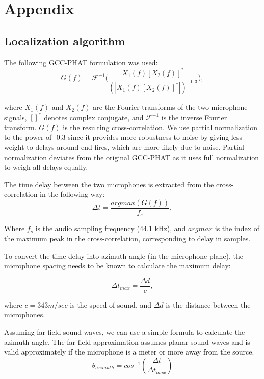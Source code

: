 \section{Appendix}

\subsection{Localization algorithm}  \label{label:gcc_phat}

The following GCC-PHAT formulation was used: 
\begin{equation}
G(f) = \mathcal{F}^{-1}\bigg(\frac{X_1(f)[X_2(f)]^*}{(|X_1(f)[X_2(f)]^*|)^{-0.3}}\bigg) ,
\end{equation}

where $X_1(f)$ and $X_2(f)$ are the Fourier transforms of the two microphone signals, $[]^*$ denotes complex conjugate, and $\mathcal{F}^{-1}$ is the inverse Fourier transform. $G(f)$ is the resulting cross-correlation. 
We use partial normalization to the power of -0.3 since it provides more robustness to noise by giving less weight to delays around end-fires, which are more likely due to noise. Partial normalization deviates from the original GCC-PHAT as it uses full normalization to weigh all delays equally.

The time delay between the two microphones is extracted from the cross-correlation in the following way: 
\begin{equation}
\Delta t = \frac{argmax(G(f))}{f_s} ,  
\end{equation}

Where $f_s$ is the audio sampling frequency (44.1 kHz), and $argmax$ is the index of the maximum peak in the cross-correlation, corresponding to delay in samples. 

To convert the time delay into azimuth angle (in the microphone plane), the microphone spacing needs to be known to calculate the maximum delay: 

\begin{equation}
\Delta t_{max} = \frac{\Delta d}{c} ,
\end{equation}

where $c = 343 m/sec$ is the speed of sound, and $\Delta d$ is the distance between the microphones. 

Assuming far-field sound waves, we can use a simple formula to calculate the azimuth angle. The far-field approximation assumes planar sound waves and is valid approximately if the microphone is a meter or more away from the source. 
\begin{equation}
\theta_{azimuth} = cos^{-1}(\frac{\Delta t}{ \Delta t_{max}})    
\end{equation}